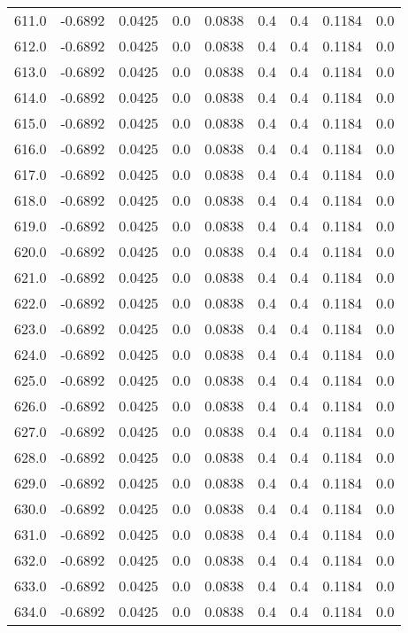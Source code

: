 \begin{longtable}{lrrrrrrrr}
611.0 & -0.6892 & 0.0425 & 0.0 & 0.0838 & 0.4 & 0.4 & 0.1184 & 0.0 \\
612.0 & -0.6892 & 0.0425 & 0.0 & 0.0838 & 0.4 & 0.4 & 0.1184 & 0.0 \\
613.0 & -0.6892 & 0.0425 & 0.0 & 0.0838 & 0.4 & 0.4 & 0.1184 & 0.0 \\
614.0 & -0.6892 & 0.0425 & 0.0 & 0.0838 & 0.4 & 0.4 & 0.1184 & 0.0 \\
615.0 & -0.6892 & 0.0425 & 0.0 & 0.0838 & 0.4 & 0.4 & 0.1184 & 0.0 \\
616.0 & -0.6892 & 0.0425 & 0.0 & 0.0838 & 0.4 & 0.4 & 0.1184 & 0.0 \\
617.0 & -0.6892 & 0.0425 & 0.0 & 0.0838 & 0.4 & 0.4 & 0.1184 & 0.0 \\
618.0 & -0.6892 & 0.0425 & 0.0 & 0.0838 & 0.4 & 0.4 & 0.1184 & 0.0 \\
619.0 & -0.6892 & 0.0425 & 0.0 & 0.0838 & 0.4 & 0.4 & 0.1184 & 0.0 \\
620.0 & -0.6892 & 0.0425 & 0.0 & 0.0838 & 0.4 & 0.4 & 0.1184 & 0.0 \\
621.0 & -0.6892 & 0.0425 & 0.0 & 0.0838 & 0.4 & 0.4 & 0.1184 & 0.0 \\
622.0 & -0.6892 & 0.0425 & 0.0 & 0.0838 & 0.4 & 0.4 & 0.1184 & 0.0 \\
623.0 & -0.6892 & 0.0425 & 0.0 & 0.0838 & 0.4 & 0.4 & 0.1184 & 0.0 \\
624.0 & -0.6892 & 0.0425 & 0.0 & 0.0838 & 0.4 & 0.4 & 0.1184 & 0.0 \\
625.0 & -0.6892 & 0.0425 & 0.0 & 0.0838 & 0.4 & 0.4 & 0.1184 & 0.0 \\
626.0 & -0.6892 & 0.0425 & 0.0 & 0.0838 & 0.4 & 0.4 & 0.1184 & 0.0 \\
627.0 & -0.6892 & 0.0425 & 0.0 & 0.0838 & 0.4 & 0.4 & 0.1184 & 0.0 \\
628.0 & -0.6892 & 0.0425 & 0.0 & 0.0838 & 0.4 & 0.4 & 0.1184 & 0.0 \\
629.0 & -0.6892 & 0.0425 & 0.0 & 0.0838 & 0.4 & 0.4 & 0.1184 & 0.0 \\
630.0 & -0.6892 & 0.0425 & 0.0 & 0.0838 & 0.4 & 0.4 & 0.1184 & 0.0 \\
631.0 & -0.6892 & 0.0425 & 0.0 & 0.0838 & 0.4 & 0.4 & 0.1184 & 0.0 \\
632.0 & -0.6892 & 0.0425 & 0.0 & 0.0838 & 0.4 & 0.4 & 0.1184 & 0.0 \\
633.0 & -0.6892 & 0.0425 & 0.0 & 0.0838 & 0.4 & 0.4 & 0.1184 & 0.0 \\
634.0 & -0.6892 & 0.0425 & 0.0 & 0.0838 & 0.4 & 0.4 & 0.1184 & 0.0 \\

\end{longtable}
